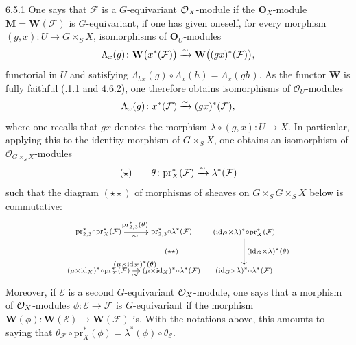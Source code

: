 \begin{definition}{6.5.1}\label{I.6.5.1}
One says that \(\mathcal{F}\) is a \(G\)-equivariant \(\mathcal{O}_X\)-module if the
\(\mathbf{O}_{X}\)-module \(\mathbf{M}=\mathbf{W}(\mathcal{F})\) is
\(G\)-equivariant, \ie if one has given oneself, for every morphism
\((g,x)\colon U\to G\times_{S}X\), isomorphisms of \(\mathbf{O}_{U}\)-modules
\[
\Lambda_{x}(g)\colon\mathbf{W}\bigl(x^{*}(\mathcal{F})\bigr)
  \xrightarrow{\sim}\mathbf{W}\bigl((gx)^{*}(\mathcal{F})\bigr),
\]
functorial in \(U\) and satisfying
\(\Lambda_{hx}(g)\circ\Lambda_{x}(h)=\Lambda_{x}(gh)\). As the functor
\(\mathbf{W}\) is fully faithful (.1.1 and 4.6.2), one therefore
obtains isomorphisms of \(\mathcal{O}_{U}\)-modules
\[
\Lambda_{x}(g)\colon x^{*}(\mathcal{F})\xrightarrow{\sim}(gx)^{*}(\mathcal{F}),
\]
where one recalls that \(gx\) denotes the morphism
\(\lambda\circ(g,x)\colon U\to X\). In particular, applying this to the
identity morphism of \(G\times_{S}X\), one obtains an isomorphism of
\(\mathcal{O}_{G\times_{S}X}\)-modules
\begin{equation*}
(\star)\qquad
\theta\colon\mathrm{pr}_{X}^{*}(\mathcal{F})\xrightarrow{\sim}\lambda^{*}(\mathcal{F})
\end{equation*}
such that the diagram \((\star\star)\) of morphisms of sheaves on
\(G\times_{S}G\times_{S}X\) below is commutative:
\[
\xymatrix@C=0.7em@R=2.6em{
*+{\scriptstyle\mathrm{pr}_{2,3}^{*}\circ\mathrm{pr}_{X}^{*}(\mathcal{F})}
  \ar[r]^{\scriptstyle\mathrm{pr}_{2,3}^{*}(\theta)}_{\sim}
&
*+{\scriptstyle\mathrm{pr}_{2,3}^{*}\circ\lambda^{*}(\mathcal{F})}
&
*+{\scriptstyle(\mathrm{id}_{G}\times\lambda)^{*}\circ\mathrm{pr}_{X}^{*}(\mathcal{F})}
  \ar[d]^{\scriptstyle(\mathrm{id}_{G}\times\lambda)^{*}(\theta)}
\\
*+{\scriptstyle(\mu\times\mathrm{id}_{X})^{*}\circ\mathrm{pr}_{X}^{*}(\mathcal{F})}
  \ar[r]^{\scriptstyle(\mu\times\mathrm{id}_{X})^{*}(\theta)}_{\sim}
&
*+{\scriptstyle(\mu\times\mathrm{id}_{X})^{*}\circ\lambda^{*}(\mathcal{F})}
  \ar@{}[u]|{(\star\star)}
&
*+{\scriptstyle(\mathrm{id}_{G}\times\lambda)^{*}\circ\lambda^{*}(\mathcal{F})}\,.
}
\]
Moreover, if \(\mathcal{E}\) is a second \(G\)-equivariant \(\mathcal{O}_X\)-module, one
says that a morphism of \(\mathcal{O}_X\)-modules
\(\phi\colon\mathcal{E}\to\mathcal{F}\) is \(G\)-equivariant if the morphism
\(\mathbf{W}(\phi)\colon\mathbf{W}(\mathcal{E})\to\mathbf{W}(\mathcal{F})\) is.
With the notations above, this amounts to saying that
\(\theta_{\mathcal{F}}\circ\mathrm{pr}_{X}^{*}(\phi)
  =\lambda^{*}(\phi)\circ\theta_{\mathcal{E}}\).
\end{definition}

